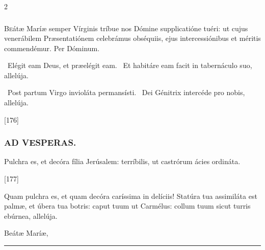 \documentclass[9pt,twoside]{extarticle}
\begin{document}
\begin{multicols}{2}
\subsubsection*{\center {}}
\lettrine{B}eátæ Maríæ semper Vírginis tríbue nos Dómine supplicatióne tuéri: ut cujus venerábilem Præsentatiónem celebrámus obséquiis, ejus intercessiónibus et méritis commendémur. Per Dóminum.

\begin{tightlist}{}
\item {}~Elégit eam Deus, et præelégit eam. ~Et habitáre eam facit in tabernáculo suo, allelúja.
\item {}~Post partum Virgo invioláta permansísti. ~Dei Génitrix intercéde pro nobis, allelúja.
\item {} [176]
\end{tightlist}

\subsubsection*{\center \textsc{AD VESPERAS.}}
\begin{tightlist}{}
\item {} Pulchra es, et decóra fília Jerúsalem: terríbilis, ut castrórum ácies ordináta.
\item {} [177]
\item {} Quam pulchra es, et quam decóra caríssima in delíciis! Statúra tua assimiláta est palmæ, et úbera tua botris: caput tuum ut Carmélus: collum tuum sicut turris ebúrnea, allelúja.
\item {} Beátæ Maríæ, 
\item {}
\end{tightlist}

\begin{center}\textcolor{red}{\rule{\linewidth}{0.5pt}} \end{center}

\subsection*{\center {}}

\end{multicols}
\end{document}
